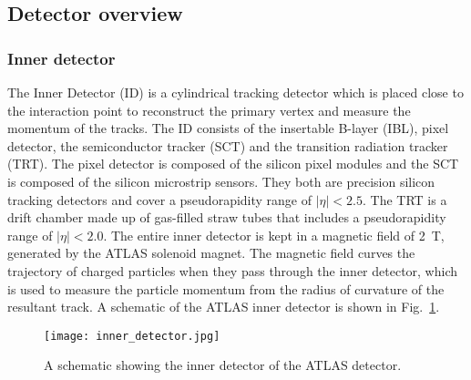 \subsection{Detector overview}%
\label{sec:lhcandatlas:atlas:components}

\subsubsection{Inner detector}%
\label{sec:lhcandatlas:atlas:inner}
The Inner Detector (ID) is a cylindrical tracking detector which is placed close to the interaction point to reconstruct the primary vertex and measure the momentum of the tracks. The ID consists of the insertable B-layer (IBL), pixel detector, the semiconductor tracker (SCT) and the transition radiation tracker (TRT). The pixel detector is composed of the silicon pixel modules and the SCT is composed of the silicon microstrip sensors. They both are precision silicon tracking detectors and cover a pseudorapidity range of $|\eta|<2.5$. The TRT is a drift chamber made up of gas-filled straw tubes that includes a pseudorapidity range of $|\eta|<2.0$. The entire inner detector is kept in a magnetic field of \SI{2}{\tesla}, generated by the ATLAS solenoid magnet. The magnetic field curves the trajectory of charged particles when they pass through the inner detector, which is used to measure the particle momentum from the radius of curvature of the resultant track. A schematic of the ATLAS inner detector is shown in Fig.\ \ref{fig:lhcandatlas:atlas:inner}.~\cite{atlas}

\begin{figure}[hbt!]
	\centering
	\texttt{[image: inner\_detector.jpg]}
	\caption{A schematic showing the inner detector of the ATLAS detector.~\cite{atlas}}
	\label{fig:lhcandatlas:atlas:inner}
\end{figure}

